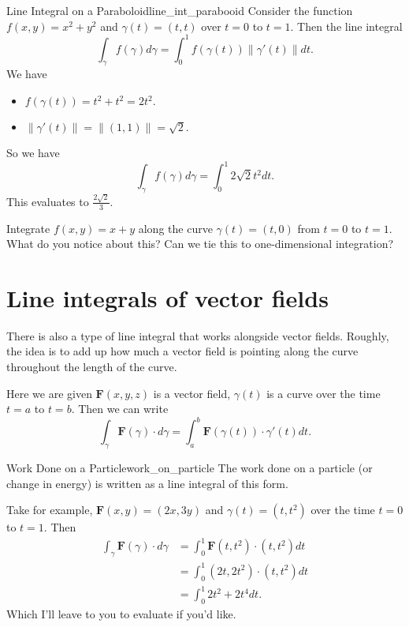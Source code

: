         \begin{ex}{Line Integral on a Paraboloid}{line_int_parabooid}
        Consider the function $f(x,y)=x^2+y^2$ and $\gamma(t)=(t,t)$ over $t=0$ to $t=1$.  Then the line integral
        \[
        \int_\gamma f(\gamma)d\gamma = \int_0^1 f(\gamma(t))\|\gamma'(t)\|dt.
        \]
        We have
        \begin{itemize}
            \item $f(\gamma(t))=t^2+t^2=2t^2.$
            \item $\|\gamma'(t)\|=\|(1,1)\|=\sqrt{2}.$
        \end{itemize}
        So we have
        \[
        \int_\gamma f(\gamma)d\gamma = \int_0^1 2\sqrt{2}t^2dt.
        \]
        This evaluates to $\frac{2\sqrt{2}}{3}$.
        \end{ex}
        
        \begin{exercise}
        Integrate $f(x,y)=x+y$ along the curve $\gamma(t)=(t,0)$ from $t=0$ to $t=1$. What do you notice about this? Can we tie this to one-dimensional integration?
        \end{exercise}
        
        \section{Line integrals of vector fields}
        
        There is also a type of line integral that works alongside vector fields.  Roughly, the idea is to add up how much a vector field is pointing along the curve throughout the length of the curve.  
        
        Here we are given $\mathbf{F}(x,y,z)$ is a vector field, $\gamma(t)$ is a curve over the time $t=a$ to $t=b$.  Then we can write
        \[
        \int_\gamma \mathbf{F}(\gamma)\cdot d\gamma =\int_a^b \mathbf{F}(\gamma(t))\cdot \gamma'(t) dt.
        \]
        
        \begin{ex}{Work Done on a Particle}{work_on_particle}
        The work done on a particle (or change in energy) is written as a line integral of this form.  
        
        Take for example, $\mathbf{F}(x,y)=(2x,3y)$ and $\gamma(t)=(t,t^2)$ over the time $t=0$ to $t=1$.  Then
        \begin{align*}
        \int_\gamma \mathbf{F}(\gamma)\cdot d\gamma &= \int_0^1 \mathbf{F}(t,t^2)\cdot (t,t^2)dt\\
        &= \int_0^1 (2t,2t^2)\cdot(t,t^2)dt\\
        &=\int_0^1 2t^2+2t^4dt.
        \end{align*}
        Which I'll leave to you to evaluate if you'd like.
        \end{ex}
        
